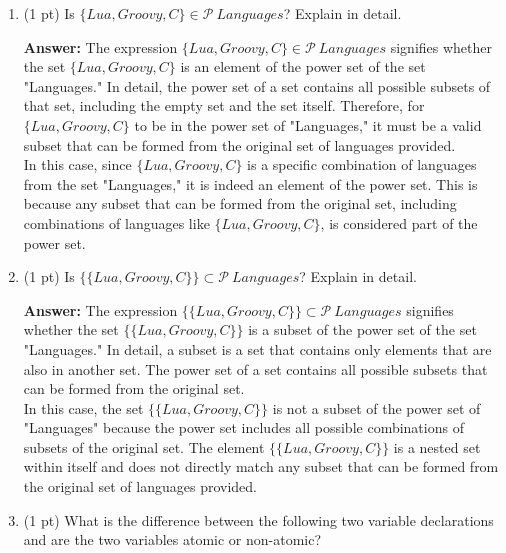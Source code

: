 \documentclass[12pt]{article}
\begin{document}
\begin{spacing}{1.5}
\begin{enumerate}
		\item (1 pt) Is $\{Lua, Groovy, C\} \in \mathcal{P} \: Languages$? Explain in detail.
		      		      
		      \textbf{Answer:} The expression $\{Lua, Groovy, C\} \in \mathcal{P} \: Languages$ signifies whether the set $\{Lua, Groovy, C\}$ is an element of the power set of the set "Languages." In detail, the power set of a set contains all possible subsets of that set, including the empty set and the set itself. Therefore, for $\{Lua, Groovy, C\}$ to be in the power set of "Languages," it must be a valid subset that can be formed from the original set of languages provided.\\
		      		                  
		      In this case, since $\{Lua, Groovy, C\}$ is a specific combination of languages from the set "Languages," it is indeed an element of the power set. This is because any subset that can be formed from the original set, including combinations of languages like $\{Lua, Groovy, C\}$, is considered part of the power set.\\
		      		                  
		\item (1 pt) Is $\{\{Lua, Groovy, C\}\} \subset \mathcal{P} \: Languages$? Explain in detail.
		      		      
		      \textbf{Answer:}  The expression $\{\{Lua, Groovy, C\}\} \subset \mathcal{P} \: Languages$ signifies whether the set $\{\{Lua, Groovy, C\}\}$ is a subset of the power set of the set "Languages." In detail, a subset is a set that contains only elements that are also in another set. The power set of a set contains all possible subsets that can be formed from the original set.\\
		      		                  
		      In this case, the set $\{\{Lua, Groovy, C\}\}$ is not a subset of the power set of "Languages" because the power set includes all possible combinations of subsets of the original set. The element $\{\{Lua, Groovy, C\}\}$ is a nested set within itself and does not directly match any subset that can be formed from the original set of languages provided.\\
		      		                  
		\item (1 pt) What is the difference between the following two variable declarations and are the two variables atomic or non-atomic?
		      		                  

\end{enumerate}
\end{spacing}
\end{document}
